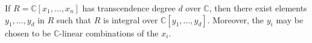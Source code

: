 If $R = \mathbb{C}[x_1, \ldots, x_n]$ has transcendence degree $d$ over $\mathbb{C}$, then there exist elements $y_1, \ldots, y_d$ in $R$ such that $R$ is integral over $\mathbb{C}[y_1, \ldots, y_d]$. Moreover, the $y_i$ may be chosen to be $\mathbb{C}$-linear combinations of the $x_i$.
